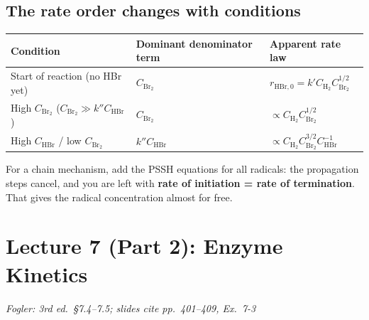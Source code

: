 \documentclass[11pt]{article}
\newcommand{\fogler}[1]{\hfill{\small\textit{\textcolor{keyblue}{Fogler: #1}}}}
\begin{document}
\subsection{The rate order changes with conditions}
\begin{center}
\renewcommand{\arraystretch}{1.3}
\begin{tabular}{lll}
\toprule
Condition & Dominant denominator term & Apparent rate law \\
\midrule
Start of reaction (no HBr yet) & $C_{\mathrm{Br_2}}$ & $r_{\mathrm{HBr},0}=k'C_{\mathrm{H_2}}C_{\mathrm{Br_2}}^{1/2}$ \\
High $C_{\mathrm{Br_2}}$ ($C_{\mathrm{Br_2}}\gg k''C_{\mathrm{HBr}}$) & $C_{\mathrm{Br_2}}$ & $\propto C_{\mathrm{H_2}}C_{\mathrm{Br_2}}^{1/2}$ \\
High $C_{\mathrm{HBr}}$ / low $C_{\mathrm{Br_2}}$ & $k''C_{\mathrm{HBr}}$ & $\propto C_{\mathrm{H_2}}C_{\mathrm{Br_2}}^{3/2}C_{\mathrm{HBr}}^{-1}$ \\
\bottomrule
\end{tabular}
\end{center}

\begin{examtip}
For a chain mechanism, add the PSSH equations for all radicals: the propagation steps cancel, and you are left with
\textbf{rate of initiation = rate of termination}. That gives the radical concentration almost for free.
\end{examtip}

\section{Lecture 7 (Part 2): Enzyme Kinetics}
\fogler{3rd ed.\ \S7.4--7.5; slides cite pp.~401--409, Ex.~7-3}
\end{document}
